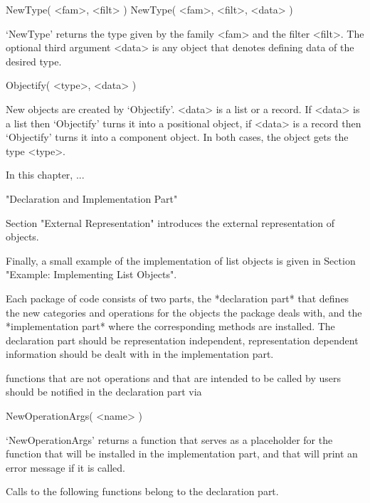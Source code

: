 \>NewType( <fam>, <filt> )
\>NewType( <fam>, <filt>, <data> )

`NewType' returns the type given by the family <fam>
and the filter <filt>.
The optional third argument <data> is any object that denotes defining
data of the desired type.



\>Objectify( <type>, <data> )

New objects are created by `Objectify'.
<data> is a list or a record.
If <data> is a list then `Objectify' turns it into a positional object,
if <data> is a record then `Objectify' turns it into a component object.
In both cases, the object gets the type <type>.




In this chapter, ...

"Declaration and Implementation Part"

Section "External Representation" introduces the external representation
of objects.

Finally, a small example of the implementation of list objects is given
in Section "Example: Implementing List Objects".


Each package of {\GAP} code consists of two parts,
the *declaration part* that defines the new categories and operations for
the objects the package deals with,
and the *implementation part* where the corresponding methods are
installed.
The declaration part should be representation independent,
representation dependent information should be dealt with in the
implementation part.

{\GAP} functions that are not operations and that are intended to be
called by users should be notified in the declaration part via

\>NewOperationArgs( <name> )

`NewOperationArgs' returns a function that serves as a placeholder
for the function that will be installed in the implementation part,
and that will print an error message if it is called.



Calls to the following functions belong to the declaration part.

